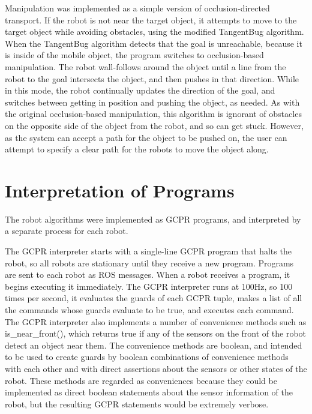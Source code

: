 Manipulation was implemented as a simple version of occlusion-directed transport. 
If the robot is not near the target object, it attempts to move to the target object while avoiding obstacles, using the modified TangentBug algorithm. 
When the TangentBug algorithm detects that the goal is unreachable, because it is inside of the mobile object, the program switches to occlusion-based manipulation. 
The robot wall-follows around the object until a line from the robot to the goal intersects the object, and then pushes in that direction. 
While in this mode, the robot continually updates the direction of the goal, and switches between getting in position and pushing the object, as needed. 
As with the original occlusion-based manipulation, this algorithm is ignorant of obstacles on the opposite side of the object from the robot, and so can get stuck. 
However, as the system can accept a path for the object to be pushed on, the user can attempt to specify a clear path for the robots to move the object along. 

\section{Interpretation of Programs}

The robot algorithms were implemented as GCPR programs, and interpreted by a separate process for each robot. 

The GCPR interpreter starts with a single-line GCPR program that halts the robot, so all robots are stationary until they receive a new program. 
Programs are sent to each robot as ROS messages. 
When a robot receives a program, it begins executing it immediately. 
The GCPR interpreter runs at 100Hz, so 100 times per second, it evaluates the guards of each GCPR tuple, makes a list of all the commands whose guards evaluate to be true, and executes each command. 
The GCPR interpreter also implements a number of convenience methods such as is\_near\_front(), which returns true if any of the sensors on the front of the robot detect an object near them. 
The convenience methods are boolean, and intended to be used to create guards by boolean combinations of convenience methods with each other and with direct assertions about the sensors or other states of the robot. 
These methods are regarded as conveniences because they could be implemented as direct boolean statements about the sensor information of the robot, but the resulting GCPR statements would be extremely verbose. 

